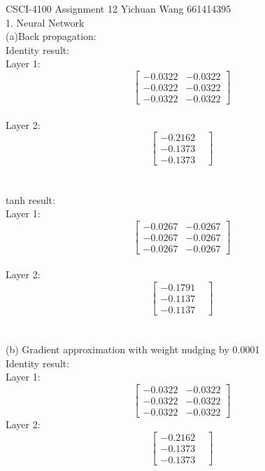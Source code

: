 \documentclass[12pt]{article}
\begin{document}
CSCI-4100 Assignment 12 Yichuan Wang 661414395\\
1. Neural Network\\
(a)Back propagation:\\
Identity result:\\
Layer 1:\\
\[
\begin{bmatrix}
    -0.0322 & -0.0322 \\
    -0.0322 & -0.0322 \\
    -0.0322 & -0.0322
\end{bmatrix}
\]\\
Layer 2:\\
\[
\begin{bmatrix}
    -0.2162 &\\
    -0.1373 &\\
    -0.1373 &
\end{bmatrix}
\]\\\\
tanh result:\\
Layer 1:\\
\[
\begin{bmatrix}
    -0.0267 & -0.0267 \\
    -0.0267 & -0.0267 \\
    -0.0267 & -0.0267
\end{bmatrix}
\]\\
Layer 2:\\
\[
\begin{bmatrix}
    -0.1791 &\\
    -0.1137 &\\
    -0.1137 &
\end{bmatrix}
\]\\\\
(b) Gradient approximation with weight nudging by 0.0001\\
Identity result:\\
Layer 1:\\
\[
\begin{bmatrix}
    -0.0322 & -0.0322 \\
    -0.0322 & -0.0322 \\
    -0.0322 & -0.0322
\end{bmatrix}
\]
Layer 2:\\
\[
\begin{bmatrix}
    -0.2162 &\\
    -0.1373 &\\
    -0.1373 &
\end{bmatrix}
\]\\
\end{document}
